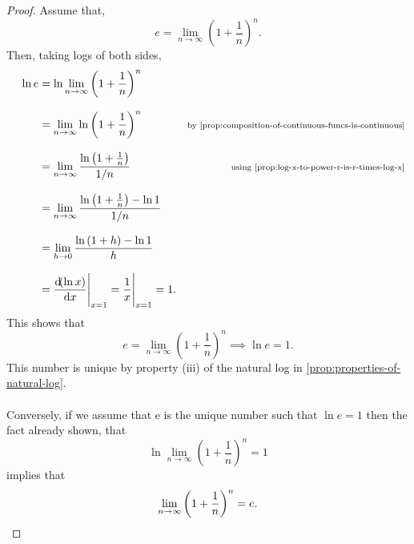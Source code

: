 \documentclass[../MathsNotesBase.tex]{subfiles}
\begin{document}
{	\bigskip\bigskip
	\begin{proof} Assume that,
		\[ e = \lim_{n \to \infty} \left(1 + \frac{1}{n}\right)^n. \]
		Then, taking logs of both sides,
		\begin{align*}
		&& \ln{e} &= \ln{\lim_{n \to \infty} \left(1 + \frac{1}{n}\right)^n} \\[8pt]
		&&  &= \lim_{n \to \infty} \ln{\left(1 + \frac{1}{n}\right)^n} &\sidecomment{by \autoref{prop:composition-of-continuous-funcs-is-continuous}} \\[8pt]
		&&  &= \lim_{n \to \infty} \frac{\ln{\left(1 + \frac{1}{n}\right)}}{1/n} &\sidecomment{using \autoref{prop:log-x-to-power-r-is-r-times-log-x}} \\[8pt]
		&&  &= \lim_{n \to \infty} \frac{\ln{\left(1 + \frac{1}{n}\right)} - \ln{1}}{1/n} &\sidecomment{} \\[8pt]
		&&  &= \lim_{h \to 0} \frac{\ln{\left(1 + h\right)} - \ln{1}}{h} &\sidecomment{} \\[8pt]
		&&  &= \eval{\frac{\dif(\ln{x})}{\dif x}}_{x=1} = \eval{\frac{1}{x}}_{x=1} = 1. &\sidecomment{}
		\end{align*}
		This shows that 
		\[ e = \lim_{n \to \infty} \left(1 + \frac{1}{n}\right)^n \implies \ln{e} = 1. \]
		This number is unique by property (iii) of the natural log in \autoref{prop:properties-of-natural-log}.\\\\
		
		Conversely, if we assume that e is the unique number such that ${ \ln{e} = 1 }$ then the fact already shown, that 
		\[ \ln{\lim_{n \to \infty} \left(1 + \frac{1}{n}\right)^n} = 1 \]
		implies that 
		\[ \lim_{n \to \infty} \left(1 + \frac{1}{n}\right)^n = e. \qedhere\]
	\end{proof}

	\bigskip\bigskip\bigskip
}
\end{document}
